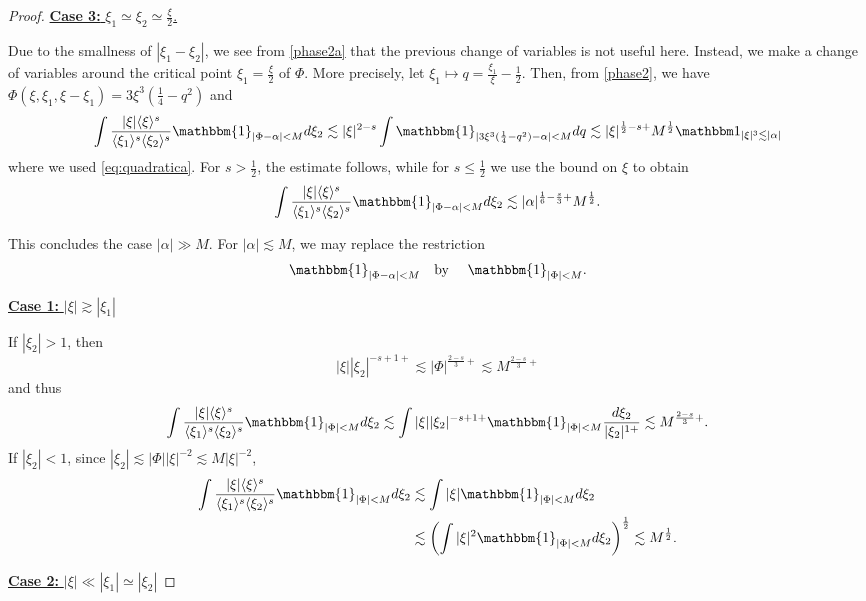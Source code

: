 \documentclass[%
11pt,  reqno]{amsart}
\newcommand{\fia}{\mathbbm{1}_{|\Phi-\alpha|<M}}
\newcommand{\jap}[1]{\langle #1 \rangle}
\newcommand{\5}{\textup{V}}
\newcommand{\noi}{\noindent}
\newcommand{\ind}{\mathbbm 1}
\newcommand{\les}{\lesssim}
\theoremstyle{remark}
\newcommand{\al}{\alpha}
\numberwithin{equation}{section}
\numberwithin{theorem}{section}
\begin{document}
\begin{proof}
\smallskip

\noi
\underline{
\textbf{Case 3:} $\xi_1\simeq \xi_2 \simeq \frac{\xi}{2}$.} 

Due to the smallness of $|\xi_1-\xi_2|$, we see from \eqref{phase2a} that the previous change of variables is not useful here. Instead,
we make a change of variables around the critical point $\xi_1 = \frac\xi2$ of $\Phi$. More precisely, let $\xi_1 \mapsto q = \frac{\xi_1}{\xi} - \frac12$. Then, from \eqref{phase2}, we have $\Phi (\xi, \xi_1,\xi-\xi_1)=  3 \xi^3 (\frac14 - q^2)$ and 
\begin{align*}
\int \frac{|\xi|\jap{\xi}^s}{\jap{\xi_1}^s\jap{\xi_2}^s}\fia d\xi_2 \lesssim |\xi|^{2-s}\int \mathbbm{1}_{|3 \xi^3 (\frac14 - q^2)-\alpha|<M}dq \les |\xi|^{\frac12-s +} M^\frac12  \ind_{|\xi|^3 \les |\al|}
\end{align*}
where we used \eqref{eq:quadratica}. For $s> \frac12$, the estimate follows, while for $s\le\frac12$ we use the bound on $\xi$ to obtain
\begin{align}
\int \frac{|\xi|\jap{\xi}^s}{\jap{\xi_1}^s\jap{\xi_2}^s}\fia d\xi_2 \les |\alpha|^{\frac16-\frac s3+} M^\frac12. 
\end{align}


\smallskip

This concludes the case $|\alpha|\gg M$. For $|\alpha|\lesssim M$, we may replace the restriction
$$
\fia \quad \mbox{by }\quad \mathbbm{1}_{|\Phi|<M}.
$$

\smallskip 
\noi
\underline{\textbf{Case 1:} $|\xi|\gtrsim |\xi_1|$} 

If $|\xi_2|>1$, then
$$
|\xi||\xi_2|^{-s+1+}\lesssim |\Phi|^{\frac{2-s}{3}+} \lesssim M^{\frac{2-s}{3}+}
$$
and thus
\begin{align}
\int \frac{|\xi|\jap{\xi}^s}{\jap{\xi_1}^s\jap{\xi_2}^s}\mathbbm{1}_{|\Phi|<M} d\xi_2 \les \int |\xi||\xi_2|^{-s+1+}\mathbbm{1}_{|\Phi|<M}\frac{d\xi_2}{|\xi_2|^{1+}}\lesssim M^{\frac{2-s}{3}+}.
\end{align}
If $|\xi_2|<1$, since $|\xi_2|\lesssim |\Phi||\xi|^{-2}\lesssim M|\xi|^{-2}$,
\begin{align}
\int \frac{|\xi|\jap{\xi}^s}{\jap{\xi_1}^s\jap{\xi_2}^s}\mathbbm{1}_{|\Phi|<M} d\xi_2 &\les \int |\xi|\mathbbm{1}_{|\Phi|<M}d\xi_2\\&\lesssim \left(\int |\xi|^2\mathbbm{1}_{|\Phi|<M} d\xi_2\right)^\frac12\lesssim M^{\frac12}.
\end{align}


\smallskip\noi
\underline{\textbf{Case 2:} $|\xi|\ll |\xi_1|\simeq |\xi_2|$} 


\end{proof}
\end{document}
